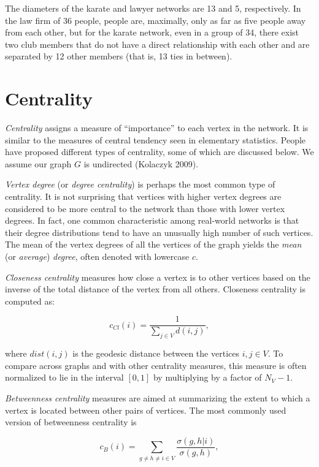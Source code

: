 \documentclass[12pt,twoside]{amherstthesis}
\begin{document}
  The diameters of the karate and lawyer networks are 13 and 5,
  respectively. In the law firm of 36 people, people are, maximally, only
  as far as five people away from each other, but for the karate network,
  even in a group of 34, there exist two club members that do not have a
  direct relationship with each other and are separated by 12 other
  members (that is, 13 ties in between).
  
  \section{Centrality}\label{centrality}
  
  \emph{Centrality} assigns a measure of ``importance'' to each vertex in
  the network. It is similar to the measures of central tendency seen in
  elementary statistics. People have proposed different types of
  centrality, some of which are discussed below. We assume our graph \(G\)
  is undirected (Kolaczyk 2009).
  
  \emph{Vertex degree} (or \emph{degree centrality}) is perhaps the most
  common type of centrality. It is not surprising that vertices with
  higher vertex degrees are considered to be more central to the network
  than those with lower vertex degrees. In fact, one common characteristic
  among real-world networks is that their degree distributions tend to
  have an unusually high number of such vertices. The mean of the vertex
  degrees of all the vertices of the graph yields the \emph{mean} (or
  \emph{average}) \emph{degree}, often denoted with lowercase \(c\).
  
  \emph{Closeness centrality} measures how close a vertex is to other
  vertices based on the inverse of the total distance of the vertex from
  all others. Closeness centrality is computed as:
  
  \[c_{Cl}(i) = \frac {1} {\sum_{j \in V}^{} d(i, j)},\]
  
  where \(dist(i,j)\) is the geodesic distance between the vertices
  \(i,j \in V\). To compare across graphs and with other centrality
  measures, this measure is often normalized to lie in the interval
  \([0,1]\) by multiplying by a factor of \(N_V - 1\).
  
  \emph{Betweenness centrality} measures are aimed at summarizing the
  extent to which a vertex is located between other pairs of vertices. The
  most commonly used version of betweenness centrality is
  
  \[c_{B}(i) = \sum_{g \neq h \neq i \in V}^{} \frac {\sigma(g,h|i)} {\sigma(g,h)},\]
  
\end{document}
